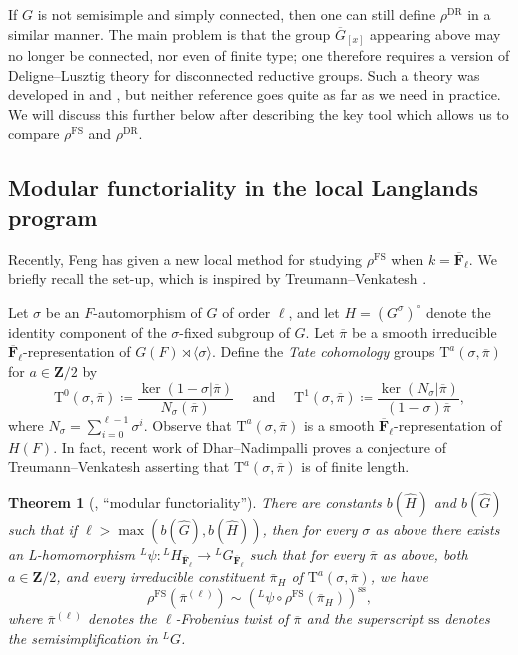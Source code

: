 \documentclass[reqno]{amsart}
\numberwithin{equation}{subsection}
\newcommand{\F}{\mathbf{F}}
\newcommand{\Z}{\mathbf{Z}}
\newcommand{\ol}[1]{\overline{#1}}
\newcommand{\wh}[1]{\widehat{#1}}
\newcommand{\co}{\colon}
\newcommand{\ld}{{}^L}
\DeclareMathOperator{\FS}{FS}
\DeclareMathOperator{\DR}{DR}
\newcommand{\rT}{\ensuremath{\mathrm{T}}\xspace}
\renewcommand{\ss}{\mathrm{ss}}
\newtheorem{thm}{Theorem}[subsection]
\theoremstyle{remark}
\numberwithin{equation}{subsection}
\numberwithin{figure}{subsection}
\begin{document}
If $G$ is not semisimple and simply connected, then one can still define $\rho^{\DR}$ in a similar manner. The main problem is that the group $\ol G_{[x]}$ appearing above may no longer be connected, nor even of finite type; one therefore requires a version of Deligne--Lusztig theory for disconnected reductive groups. Such a theory was developed in \cite{DM94} and \cite{Kal21b}, but neither reference goes quite as far as we need in practice. We will discuss this further below after describing the key tool which allows us to compare $\rho^{\FS}$ and $\rho^{\DR}$.

\subsection{Modular functoriality in the local Langlands program}

Recently, Feng \cite{F24} has given a new local method for studying $\rho^{\FS}$ when $k = \ol\F_\ell$. We briefly recall the set-up, which is inspired by Treumann--Venkatesh \cite{TV}. 

Let $\sigma$ be an $F$-automorphism of $G$ of order $\ell$, and let $H = (G^\sigma)^\circ$ denote the identity component of the $\sigma$-fixed subgroup of $G$. Let $\ol\pi$ be a smooth irreducible $\ol\F_\ell$-representation of $G(F) \rtimes \langle\sigma\rangle$. Define the \emph{Tate cohomology} groups $\rT^a(\sigma, \ol\pi)$ for $a \in \Z/2$ by
\[
\rT^0(\sigma, \ol\pi) \coloneqq \frac{\ker(1-\sigma | \ol\pi)}{N_\sigma(\ol\pi)} \quad \text{ and } \quad 
\rT^1(\sigma, \ol\pi) \coloneqq \frac{\ker(N_\sigma | \ol\pi)}{( 1-\sigma  ) \ol\pi},
\]
where $N_\sigma = \sum_{i=0}^{\ell-1} \sigma^i$. Observe that $\rT^a(\sigma, \ol\pi)$ is a smooth $\ol\F_\ell$-representation of $H(F)$. In fact, recent work of Dhar--Nadimpalli \cite[Theorem~1.1]{DN25} proves a conjecture of Treumann--Venkatesh asserting that $\rT^a(\sigma, \ol\pi)$ is of finite length.

\begin{thm}[{\cite[Theorem~1.3.1]{F24}}, ``modular functoriality'']\label{thm:feng-modular-functoriality}
    There are constants $b(\wh H)$ and $b(\wh G)$ such that if $\ell > \max(b(\wh G), b(\wh H))$, then for every $\sigma$ as above there exists an L-homomorphism $\ld\psi\co \ld H_{\ol\F_\ell} \to \ld G_{\ol\F_\ell}$ such that for every $\ol\pi$ as above, both $a \in \Z/2$, and every irreducible constituent $\ol\pi_H$ of $\rT^a(\sigma, \ol\pi)$, we have
    \[
    \rho^{\FS}(\ol\pi^{(\ell)}) \sim (\ld\psi \circ \rho^{\FS}(\ol\pi_H))^{\ss},
    \]
    where $\ol\pi^{(\ell)}$ denotes the $\ell$-Frobenius twist of $\ol\pi$ and the superscript $\ss$ denotes the semisimplification in $\ld G$.
\end{thm}
\end{document}
